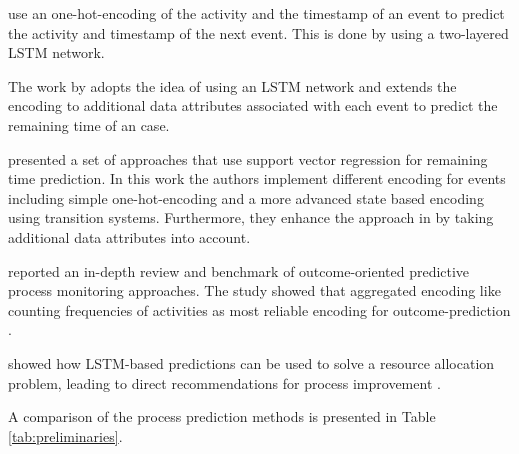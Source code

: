 \citeauthor{DBLP:conf/caise/TaxVRD17} use an one-hot-encoding of the activity and the timestamp of an event to predict the activity and timestamp of the next event.
This is done by using a two-layered LSTM network\cite{DBLP:conf/caise/TaxVRD17}.


The work by \citeauthor{DBLP:conf/ssci/NavarinVPS17} adopts the idea of using an LSTM network \cite{DBLP:conf/caise/TaxVRD17} and extends the encoding to additional data attributes associated with each event\cite{DBLP:conf/ssci/NavarinVPS17} to predict the remaining time of an case.

\citeauthor{DBLP:journals/computing/PolatoSBL18} presented a set of approaches that use support vector regression for remaining time prediction\cite{DBLP:journals/computing/PolatoSBL18}.
In this work the authors implement different encoding for events including simple one-hot-encoding and a more advanced state based encoding using transition systems.
Furthermore, they enhance the approach in  \cite{DBLP:journals/is/AalstSS11} by taking additional data attributes into account.

\citeauthor{DBLP:journals/tkdd/TeinemaaDRM19} reported an in-depth review and benchmark of outcome-oriented predictive process monitoring approaches.
The study showed that aggregated encoding like counting frequencies of activities as most reliable encoding for outcome-prediction \cite{DBLP:journals/tkdd/TeinemaaDRM19}.

\citeauthor{DBLP:conf/icpm/ParkS19} showed how LSTM-based predictions can be used to solve a resource allocation problem, leading to direct recommendations for process improvement \cite{DBLP:conf/icpm/ParkS19}.

A comparison of the process prediction methods is presented in Table \ref{tab:preliminaries}.


